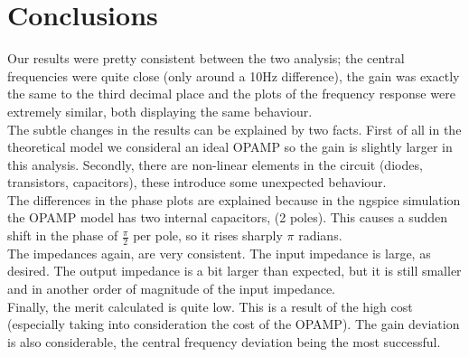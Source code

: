 \section{Conclusions}
\label{sec:conc}
Our results were pretty consistent between the two analysis; the central frequencies were quite close (only around a 10Hz difference), the gain was exactly the same to the third decimal place and the plots of the frequency response were extremely similar, both displaying the same behaviour. \\
The subtle changes in the results can be explained by two facts. First of all in the theoretical model we consideral an ideal OPAMP so the gain is slightly larger in this analysis. Secondly, there are non-linear elements in the circuit (diodes, transistors, capacitors), these introduce some unexpected behaviour.\\
The differences in the phase plots are explained because in the ngspice simulation the OPAMP model has two internal capacitors, (2 poles). This causes a sudden shift in the phase of $\frac{\pi}{2}$ per pole, so it rises sharply $\pi$ radians.\\
The impedances again, are very consistent. The input impedance is large, as desired. The output impedance is a bit larger than expected, but it is still smaller and in another order of magnitude of the input impedance.\\
Finally, the merit calculated is quite low. This is a result of the high cost (especially taking into consideration the cost of the OPAMP). The gain deviation is also considerable, the central frequency deviation being the most successful.
